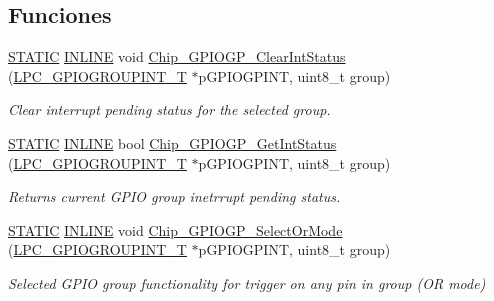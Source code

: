 \subsection*{Funciones}
\begin{DoxyCompactItemize}
\item 
\hyperlink{group___l_p_c___types___public___macros_ga10b2d890d871e1489bb02b7e70d9bdfb}{S\+T\+A\+T\+IC} \hyperlink{spifi__18xx__43xx_8h_a2eb6f9e0395b47b8d5e3eeae4fe0c116}{I\+N\+L\+I\+NE} void \hyperlink{group___g_p_i_o_g_p__18_x_x__43_x_x_gacb2b28673be061951f30cac631015be1}{Chip\+\_\+\+G\+P\+I\+O\+G\+P\+\_\+\+Clear\+Int\+Status} (\hyperlink{struct_l_p_c___g_p_i_o_g_r_o_u_p_i_n_t___t}{L\+P\+C\+\_\+\+G\+P\+I\+O\+G\+R\+O\+U\+P\+I\+N\+T\+\_\+T} $\ast$p\+G\+P\+I\+O\+G\+P\+I\+NT, uint8\+\_\+t group)
\begin{DoxyCompactList}\small\item\em Clear interrupt pending status for the selected group. \end{DoxyCompactList}\item 
\hyperlink{group___l_p_c___types___public___macros_ga10b2d890d871e1489bb02b7e70d9bdfb}{S\+T\+A\+T\+IC} \hyperlink{spifi__18xx__43xx_8h_a2eb6f9e0395b47b8d5e3eeae4fe0c116}{I\+N\+L\+I\+NE} bool \hyperlink{group___g_p_i_o_g_p__18_x_x__43_x_x_ga1f34e79048a85055093d15d67294a86f}{Chip\+\_\+\+G\+P\+I\+O\+G\+P\+\_\+\+Get\+Int\+Status} (\hyperlink{struct_l_p_c___g_p_i_o_g_r_o_u_p_i_n_t___t}{L\+P\+C\+\_\+\+G\+P\+I\+O\+G\+R\+O\+U\+P\+I\+N\+T\+\_\+T} $\ast$p\+G\+P\+I\+O\+G\+P\+I\+NT, uint8\+\_\+t group)
\begin{DoxyCompactList}\small\item\em Returns current G\+P\+IO group inetrrupt pending status. \end{DoxyCompactList}\item 
\hyperlink{group___l_p_c___types___public___macros_ga10b2d890d871e1489bb02b7e70d9bdfb}{S\+T\+A\+T\+IC} \hyperlink{spifi__18xx__43xx_8h_a2eb6f9e0395b47b8d5e3eeae4fe0c116}{I\+N\+L\+I\+NE} void \hyperlink{group___g_p_i_o_g_p__18_x_x__43_x_x_ga11ad479a890f736ae3479e69d8381d16}{Chip\+\_\+\+G\+P\+I\+O\+G\+P\+\_\+\+Select\+Or\+Mode} (\hyperlink{struct_l_p_c___g_p_i_o_g_r_o_u_p_i_n_t___t}{L\+P\+C\+\_\+\+G\+P\+I\+O\+G\+R\+O\+U\+P\+I\+N\+T\+\_\+T} $\ast$p\+G\+P\+I\+O\+G\+P\+I\+NT, uint8\+\_\+t group)
\begin{DoxyCompactList}\small\item\em Selected G\+P\+IO group functionality for trigger on any pin in group (OR mode) \end{DoxyCompactList}\item 

\end{DoxyCompactItemize}
